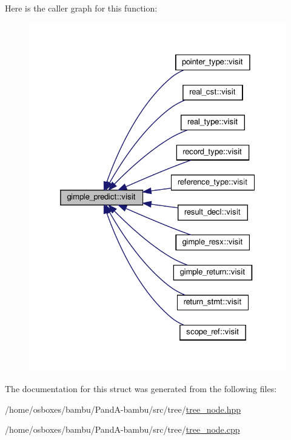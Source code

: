 Here is the caller graph for this function\+:
\nopagebreak
\begin{figure}[H]
\begin{center}
\leavevmode
\includegraphics[width=325pt]{de/dfd/structgimple__predict_af7e0810d1e453a5f90ceefaaa4d2c1f3_icgraph}
\end{center}
\end{figure}


The documentation for this struct was generated from the following files\+:\begin{DoxyCompactItemize}
\item 
/home/osboxes/bambu/\+Pand\+A-\/bambu/src/tree/\hyperlink{tree__node_8hpp}{tree\+\_\+node.\+hpp}\item 
/home/osboxes/bambu/\+Pand\+A-\/bambu/src/tree/\hyperlink{tree__node_8cpp}{tree\+\_\+node.\+cpp}\end{DoxyCompactItemize}
